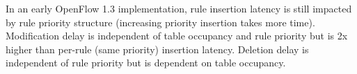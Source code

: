 \begin{compactitemize}
\item {}

\item In an early OpenFlow 1.3 implementation, rule insertion latency is still impacted by rule priority structure (increasing priority insertion takes more time). Modification delay is independent of table occupancy and rule priority but is 2x higher than per-rule (same priority) insertion latency. Deletion delay is independent of rule priority but is dependent on table occupancy. 


%
%

\end{compactitemize}

